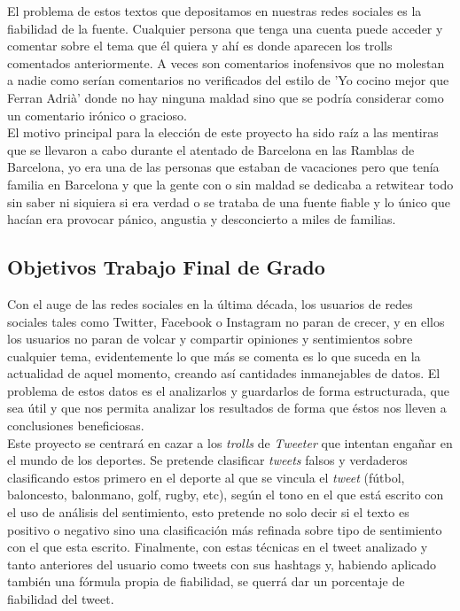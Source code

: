 \documentclass[../all.tex]{subfiles}
\begin{document}
    El problema de estos textos que depositamos en nuestras redes sociales es la fiabilidad de la fuente. Cualquier persona que tenga una cuenta puede acceder y comentar sobre el tema que él quiera y ahí es donde aparecen los trolls comentados anteriormente. A veces son comentarios inofensivos que no molestan a nadie como serían comentarios no verificados del estilo de 'Yo cocino mejor que Ferran Adrià' donde no hay ninguna maldad sino que se podría considerar como un comentario irónico o gracioso.\\
    
    El motivo principal para la elección de este proyecto ha sido raíz a las mentiras que se llevaron a cabo durante el atentado de Barcelona en las Ramblas de Barcelona, yo era una de las personas que estaban de vacaciones pero que tenía familia en Barcelona y que la gente con o sin maldad se dedicaba a retwitear todo sin saber ni siquiera si era verdad o se trataba de una fuente fiable y lo único que hacían era provocar pánico, angustia y desconcierto a miles de familias.
    

\newpage
\subsection{Objetivos Trabajo Final de Grado}
    Con el auge de las redes sociales en la última década, los usuarios de redes sociales tales como Twitter, Facebook o Instagram no paran de crecer, y en ellos los usuarios no paran de volcar y compartir opiniones y sentimientos sobre cualquier tema, evidentemente lo que más se comenta es lo que suceda en la actualidad de aquel momento, creando así cantidades inmanejables de datos. El problema de estos datos es el analizarlos y guardarlos de forma estructurada, que sea útil y que nos permita analizar los resultados de forma que éstos nos lleven a conclusiones beneficiosas.\\
   
    Este proyecto se centrará en cazar a los \textit{trolls} de \textit{Tweeter} que  intentan engañar en el mundo de los deportes. Se pretende clasificar \textit{tweets} falsos y verdaderos clasificando estos primero en el deporte al que se vincula el \textit{tweet} (fútbol, baloncesto, balonmano, golf, rugby, etc), según el tono en el que está escrito con el uso de análisis del sentimiento, esto pretende no solo decir si el texto es positivo o negativo sino una clasificación más refinada sobre tipo de sentimiento con el que esta escrito. Finalmente, con estas técnicas en el tweet analizado y tanto anteriores del usuario como tweets con sus hashtags y, habiendo aplicado también una fórmula propia de fiabilidad, se querrá dar un porcentaje de fiabilidad del tweet.\\
   
\end{document}
